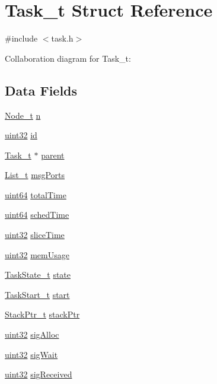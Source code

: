 \hypertarget{structTask__t}{\section{Task\+\_\+t Struct Reference}
\label{structTask__t}
}


{\ttfamily \#include $<$task.\+h$>$}



Collaboration diagram for Task\+\_\+t\+:
\subsection*{Data Fields}
\begin{DoxyCompactItemize}
\item 
\hyperlink{structNode__t}{Node\+\_\+t} \hyperlink{structTask__t_a69e708364521aff42036b9d86e4cb968}{n}
\item 
\hyperlink{type_8h_acbd4acd0d29e2d6c43104827f77d9cd2}{uint32} \hyperlink{structTask__t_a6df8c7a4318fa3e37d9328a983150464}{id}
\item 
\hyperlink{structTask__t}{Task\+\_\+t} $\ast$ \hyperlink{structTask__t_aede7e4f79bf2d5c79978e3ed1408ef1b}{parent}
\item 
\hyperlink{structList__t}{List\+\_\+t} \hyperlink{structTask__t_a8b20bc3826bee517b533942f324ea301}{msg\+Ports}
\item 
\hyperlink{type_8h_abc0f5bc07737e498f287334775dff2b6}{uint64} \hyperlink{structTask__t_ad613b9d3b5f8f30b8cd4efe1763011f8}{total\+Time}
\item 
\hyperlink{type_8h_abc0f5bc07737e498f287334775dff2b6}{uint64} \hyperlink{structTask__t_a29d285141baf9b8079c10e7e8f79b832}{sched\+Time}
\item 
\hyperlink{type_8h_acbd4acd0d29e2d6c43104827f77d9cd2}{uint32} \hyperlink{structTask__t_a751511f316ef6c38f23452c6aa618176}{slice\+Time}
\item 
\hyperlink{type_8h_acbd4acd0d29e2d6c43104827f77d9cd2}{uint32} \hyperlink{structTask__t_ab038e28283fe5ef91c6b52b3017b61e2}{mem\+Usage}
\item 
\hyperlink{task_8h_af7d1d3bc2c408906b5a25c8cc7a8346a}{Task\+State\+\_\+t} \hyperlink{structTask__t_af387ad54a097d50b2883d3d9352abeac}{state}
\item 
\hyperlink{task_8h_aeaa40d24cbae67d9cd352d7006fd9bf6}{Task\+Start\+\_\+t} \hyperlink{structTask__t_a69d6f6fc71ab8a7dfbc7e56567806d37}{start}
\item 
\hyperlink{task_8h_a8c926d9f7fa97404f8969b90981824fb}{Stack\+Ptr\+\_\+t} \hyperlink{structTask__t_ad71ac9566e50151c4976761ed2867baf}{stack\+Ptr}
\item 
\hyperlink{type_8h_acbd4acd0d29e2d6c43104827f77d9cd2}{uint32} \hyperlink{structTask__t_af3012e69b353953ed973d2c4b3681708}{sig\+Alloc}
\item 
\hyperlink{type_8h_acbd4acd0d29e2d6c43104827f77d9cd2}{uint32} \hyperlink{structTask__t_a809491a52f9a7b99ca0cf12cf8838189}{sig\+Wait}
\item 
\hyperlink{type_8h_acbd4acd0d29e2d6c43104827f77d9cd2}{uint32} \hyperlink{structTask__t_a9976e3b7d8f1563a223028e78f1b0acb}{sig\+Received}
\end{DoxyCompactItemize}


